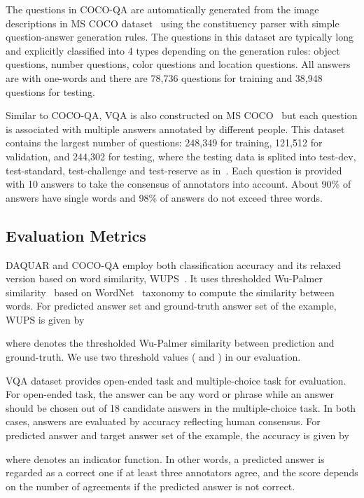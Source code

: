\documentclass[10pt,twocolumn,letterpaper]{article}
\begin{document}
The questions in COCO-QA are automatically generated from the image descriptions in MS COCO dataset~\cite{Mscoco} using the constituency parser with simple question-answer generation rules.
The questions in this dataset are typically long and explicitly classified into 4 types depending on the generation rules: object questions, number questions, color questions and location questions.
All answers are with one-words and there are 78,736 questions for training and 38,948 questions for testing.

Similar to COCO-QA, VQA is also constructed on MS COCO~\cite{Mscoco} but each question is associated with multiple answers annotated by different people. 
This dataset contains the largest number of questions: 248,349 for training, 121,512 for validation, and 244,302 for testing, where the testing data is splited into test-dev, test-standard, test-challenge and test-reserve as in~\cite{Mscoco}.
Each question is provided with 10 answers to take the consensus of annotators into account.
About 90\% of answers have single words and 98\% of answers do not exceed three words.


\subsection{Evaluation Metrics}


DAQUAR and COCO-QA employ both classification accuracy and its relaxed version based on word similarity, WUPS~\cite{Multiworld}.
It uses thresholded Wu-Palmer similarity~\cite{wu1994verbs} based on WordNet~\cite{fellbaum1998wordnet} taxonomy to compute the similarity between words.
For predicted answer set  and ground-truth answer set  of the  example, WUPS is given by

where  denotes the thresholded Wu-Palmer similarity between prediction and ground-truth.
We use two threshold values ( and ) in our evaluation.

VQA dataset provides open-ended task and multiple-choice task for evaluation.
For open-ended task, the answer can be any word or phrase while an answer should be chosen out of 18 candidate answers in the multiple-choice task.
In both cases, answers are evaluated by accuracy reflecting human consensus.
For predicted answer  and target answer set  of the  example, the accuracy is given by

where  denotes an indicator function.
In other words, a predicted answer is regarded as a correct one if at least three annotators agree, and the score depends on the number of agreements if the predicted answer is not correct.
\end{document}
